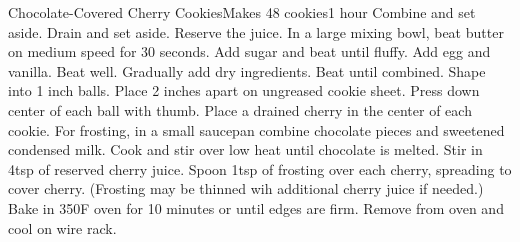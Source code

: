 \begin{recipe}{Chocolate-Covered Cherry Cookies}{Makes 48 cookies}{1 hour}
  Combine and set aside.
  Drain and set aside.  Reserve the juice.
  In a large mixing bowl, beat butter on medium speed for 30 seconds.  Add sugar and beat until fluffy.  Add egg and vanilla.  Beat well.  Gradually add dry ingredients.  Beat until combined.  Shape into 1 inch balls.  Place 2 inches apart on ungreased cookie sheet.  Press down center of each ball with thumb.  Place a drained cherry in the center of each cookie.
  For frosting, in a small saucepan combine chocolate pieces and sweetened condensed milk.  Cook and stir over low heat until chocolate is melted.  Stir in 4tsp of reserved cherry juice.  Spoon 1tsp of frosting over each cherry, spreading to cover cherry.  (Frosting may be thinned wih additional cherry juice if needed.)
  Bake in 350\0F oven for 10 minutes or until edges are firm.  Remove 
  from oven and cool on wire rack.
\end{recipe}